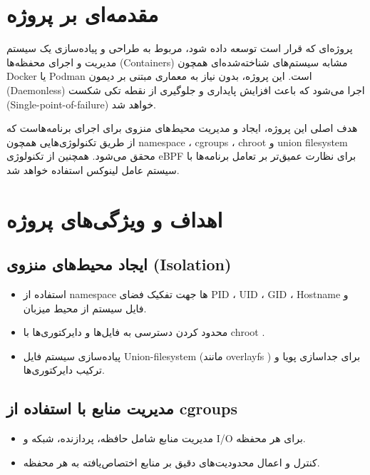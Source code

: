\documentclass[10pt,a4paper]{article}
\begin{document}


\section{مقدمه‌ای بر پروژه}

پروژه‌ای که قرار است توسعه داده شود، مربوط به طراحی و پیاده‌سازی یک سیستم مدیریت و اجرای محفظه‌ها (Containers) مشابه سیستم‌های شناخته‌شده‌ای همچون Docker یا Podman است. این پروژه، بدون نیاز به معماری مبتنی بر دیمون (Daemonless) اجرا می‌شود که باعث افزایش پایداری و جلوگیری از نقطه تکی شکست (Single-point-of-failure) خواهد شد.

هدف اصلی این پروژه، ایجاد و مدیریت محیط‌های منزوی برای اجرای برنامه‌هاست که از طریق تکنولوژی‌هایی همچون namespace ، cgroups ، chroot و union filesystem محقق می‌شود. همچنین از تکنولوژی eBPF برای نظارت عمیق‌تر بر تعامل برنامه‌ها با سیستم عامل لینوکس استفاده خواهد شد.


\section{اهداف و ویژگی‌های پروژه}

\subsection{ایجاد محیط‌های منزوی (Isolation)}

\begin{itemize}
	\item
	 استفاده از namespace ها جهت تفکیک فضای PID ، UID ، GID ، Hostname و فایل سیستم از محیط میزبان.
	\item محدود کردن دسترسی به فایل‌ها و دایرکتوری‌ها با
	 chroot .
	\item
	 پیاده‌سازی سیستم فایل Union-filesystem (مانند overlayfs ) برای جداسازی پویا و ترکیب دایرکتوری‌ها.
\end{itemize}

\subsection{مدیریت منابع با استفاده از cgroups}

\begin{itemize}
	\item مدیریت منابع شامل حافظه، پردازنده، شبکه و I/O برای هر محفظه.
	\item کنترل و اعمال محدودیت‌های دقیق بر منابع اختصاص‌یافته به هر محفظه.
\end{itemize}
\end{document}
